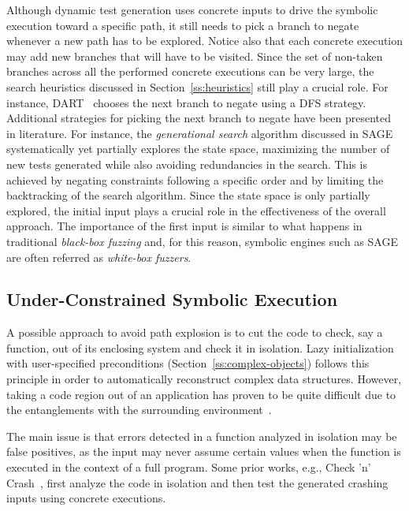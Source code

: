 \noindent Although dynamic test generation uses concrete inputs to drive the symbolic execution toward a specific path, it still needs to pick a branch to negate whenever a new path has to be explored. Notice also that each concrete execution may add new branches that will have to be visited. Since the set of non-taken branches across all the performed concrete executions can be very large, the search heuristics discussed in Section~\ref{ss:heuristics} still play a crucial role. For instance, {\sc DART}~\cite{DART-PLDI05} chooses the next branch to negate using a DFS strategy. Additional strategies for picking the next branch to negate have been presented in literature. For instance, the {\em generational search} algorithm discussed in {\sc SAGE}~\cite{SAGE-NDSS08} systematically yet partially explores the state space, maximizing the number of new tests generated while also avoiding redundancies in the search. This is achieved by negating constraints following a specific order and by limiting the backtracking of the search algorithm. Since the state space is only partially explored, the initial input plays a crucial role in the effectiveness of the overall approach.  The importance of the first input is similar to what happens in traditional {\em black-box fuzzing} and, for this reason, symbolic engines such as {\sc SAGE} are often referred as {\em white-box fuzzers}.


\subsection{Under-Constrained Symbolic Execution} 
\label{under-constrained}

A possible approach to avoid path explosion is to cut the code to check, say a function, out of its enclosing system and check it in isolation. Lazy initialization with user-specified preconditions (Section~\ref{ss:complex-objects}) follows this principle in order to automatically reconstruct complex  data structures. However, taking a code region out of an application has proven to be quite difficult due to the entanglements with the surrounding environment~\cite{ED-ISSTA07}.

The main issue is that errors detected in a function analyzed in isolation may be false positives, as the input may never assume certain values when the function is executed in the context of a full program. Some prior works, e.g., {\sc Check 'n' Crash}~\cite{CS-ICSE05}, first analyze the code in isolation and then test the generated crashing inputs using concrete executions.


